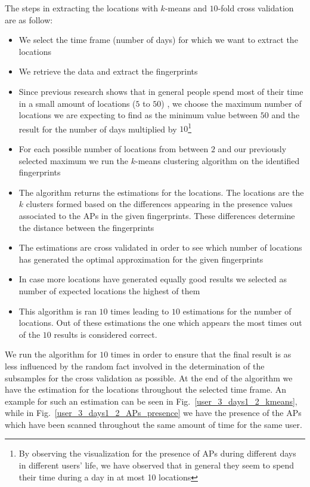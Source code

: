 The steps in extracting the locations with $k$-means and $10$-fold cross
validation are as follow:
\begin{itemize}
  \item We select the time frame (number of days) for which we want to extract
  the locations
  \item We retrieve the data and extract the fingerprints
  \item Since previous research shows that in general people spend most of their
  time in a small amount of locations ($5$ to $50$) \cite{Barabasi08}, we choose
  the maximum number of locations we are expecting to find as the minimum value
  between $50$ and the result for the number of days multiplied by
  $10$\footnote{By observing the visualization for the presence of APs during
  different days in different users' life, we have observed that in general
  they seem to spend their time during a day in at most 10 locations}
  \item For each possible number of locations from between $2$ and our
  previously selected maximum we run the $k$-means clustering algorithm on the
  identified fingerprints
  \item The algorithm returns the estimations for the locations. The locations
  are the $k$ clusters formed based on the differences appearing in the presence
  values associated to the APs in the given fingerprints. These differences
  determine the distance between the fingerprints
  \item The estimations are cross validated in order to see which number of
  locations has generated the optimal approximation for the given fingerprints
  \item In case more locations have generated equally good results we selected
  as number of expected locations the highest of them
  \item This algorithm is ran $10$ times leading to $10$ estimations for the
  number of locations. Out of these estimations the one which appears the most times
  out of the $10$ results is considered correct.
\end{itemize}

We run the algorithm for $10$ times in order to ensure that the final result
is as less influenced by the random fact involved in the determination of the
subsamples for the cross validation as possible. At the end of the algorithm we
have the estimation for the locations throughout the selected time frame. An
example for such an estimation can be seen in Fig.~\ref{user_3_days1_2_kmeans},
while in Fig.~\ref{user_3_days1_2_APs_presence} we have the presence of the APs
which have been scanned throughout the same amount of time for the same user.

